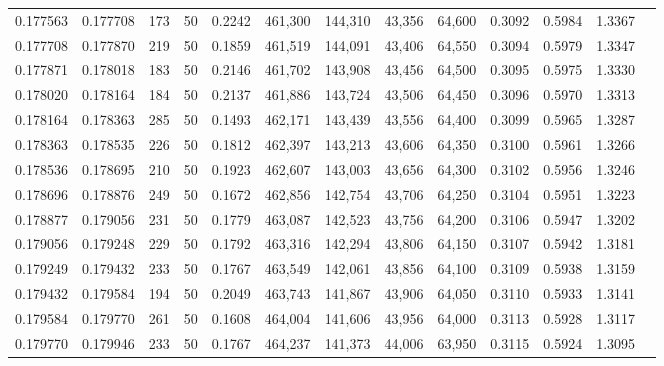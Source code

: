 \begin{tabular}{rrrrrrrrrrrrr}
0.177563 & 0.177708 &   173 &  50 &                                     0.2242 & 461,300 & 144,310 &  43,356 &  64,600 & 0.3092 & 0.5984 & 1.3367 \\
0.177708 & 0.177870 &   219 &  50 &                                     0.1859 & 461,519 & 144,091 &  43,406 &  64,550 & 0.3094 & 0.5979 & 1.3347 \\
0.177871 & 0.178018 &   183 &  50 &                                     0.2146 & 461,702 & 143,908 &  43,456 &  64,500 & 0.3095 & 0.5975 & 1.3330 \\
0.178020 & 0.178164 &   184 &  50 &                                     0.2137 & 461,886 & 143,724 &  43,506 &  64,450 & 0.3096 & 0.5970 & 1.3313 \\
0.178164 & 0.178363 &   285 &  50 &                                     0.1493 & 462,171 & 143,439 &  43,556 &  64,400 & 0.3099 & 0.5965 & 1.3287 \\
0.178363 & 0.178535 &   226 &  50 &                                     0.1812 & 462,397 & 143,213 &  43,606 &  64,350 & 0.3100 & 0.5961 & 1.3266 \\
0.178536 & 0.178695 &   210 &  50 &                                     0.1923 & 462,607 & 143,003 &  43,656 &  64,300 & 0.3102 & 0.5956 & 1.3246 \\
0.178696 & 0.178876 &   249 &  50 &                                     0.1672 & 462,856 & 142,754 &  43,706 &  64,250 & 0.3104 & 0.5951 & 1.3223 \\
0.178877 & 0.179056 &   231 &  50 &                                     0.1779 & 463,087 & 142,523 &  43,756 &  64,200 & 0.3106 & 0.5947 & 1.3202 \\
0.179056 & 0.179248 &   229 &  50 &                                     0.1792 & 463,316 & 142,294 &  43,806 &  64,150 & 0.3107 & 0.5942 & 1.3181 \\
0.179249 & 0.179432 &   233 &  50 &                                     0.1767 & 463,549 & 142,061 &  43,856 &  64,100 & 0.3109 & 0.5938 & 1.3159 \\
0.179432 & 0.179584 &   194 &  50 &                                     0.2049 & 463,743 & 141,867 &  43,906 &  64,050 & 0.3110 & 0.5933 & 1.3141 \\
0.179584 & 0.179770 &   261 &  50 &                                     0.1608 & 464,004 & 141,606 &  43,956 &  64,000 & 0.3113 & 0.5928 & 1.3117 \\
0.179770 & 0.179946 &   233 &  50 &                                     0.1767 & 464,237 & 141,373 &  44,006 &  63,950 & 0.3115 & 0.5924 & 1.3095 \\

\end{tabular}
